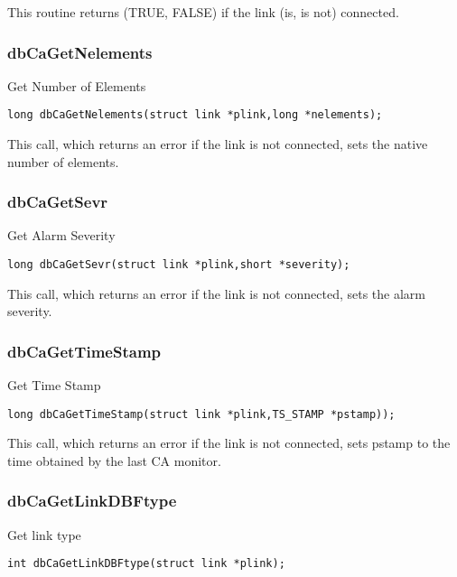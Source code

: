 This routine returns (TRUE, FALSE) if the link (is, is not) connected.

\subsubsection{dbCaGetNelements}

Get Number of Elements

\begin{verbatim}
long dbCaGetNelements(struct link *plink,long *nelements);
\end{verbatim}

This call, which returns an error if the link is not connected, sets the native number of elements.

\subsubsection{dbCaGetSevr}

Get Alarm Severity

\begin{verbatim}
long dbCaGetSevr(struct link *plink,short *severity);
\end{verbatim}

This call, which returns an error if the link is not connected, sets the alarm severity.

\subsubsection{dbCaGetTimeStamp}

Get Time Stamp

\begin{verbatim}
long dbCaGetTimeStamp(struct link *plink,TS_STAMP *pstamp));
\end{verbatim}

This call, which returns an error if the link is not connected, sets pstamp to the time obtained by the last CA monitor.

\subsubsection{dbCaGetLinkDBFtype}

Get link type

\begin{verbatim}
int dbCaGetLinkDBFtype(struct link *plink);
\end{verbatim}


